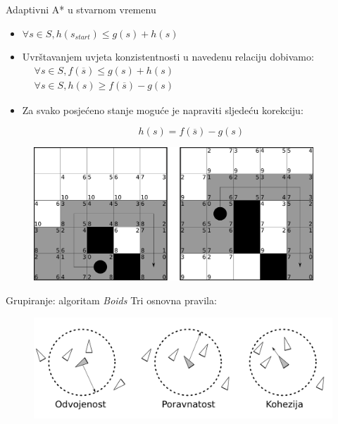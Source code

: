 \documentclass[utf8]{beamer}
\begin{document}
\begin{frame}{Adaptivni A* u stvarnom vremenu}
     {
        \begin{itemize}
            \item \(\forall s \in S, h(s_{start}) \leq g(s) + h(s)\)

            \item {
                Uvrštavanjem uvjeta konzistentnosti u navedenu relaciju dobivamo:
                \(
                \begin{aligned}
                & \forall s \in S, f(\overline{s}) \leq g(s) + h(s)\\
                & \forall s \in S, h(s) \geq f(\overline{s}) - g(s)
                \end{aligned}
                \)
            }

            \item { 
                Za svako posjećeno stanje moguće je napraviti sljedeću korekciju:
                
                \[h(s) = f(\overline{s}) - g(s)\]
            }
        \end{itemize}
    }

     {
        \begin{figure}[h]
            \centering
            \includegraphics[height=5cm]{images/rtaastar.pdf}
        \end{figure}
    }
\end{frame}

\begin{frame}{Grupiranje: algoritam \textit{Boids}}
    Tri osnovna pravila:
    \begin{figure}[h]
        \centering
        \includegraphics[width=1.0\linewidth]{images/boids.pdf}
    \end{figure}
\end{frame}
\end{document}
